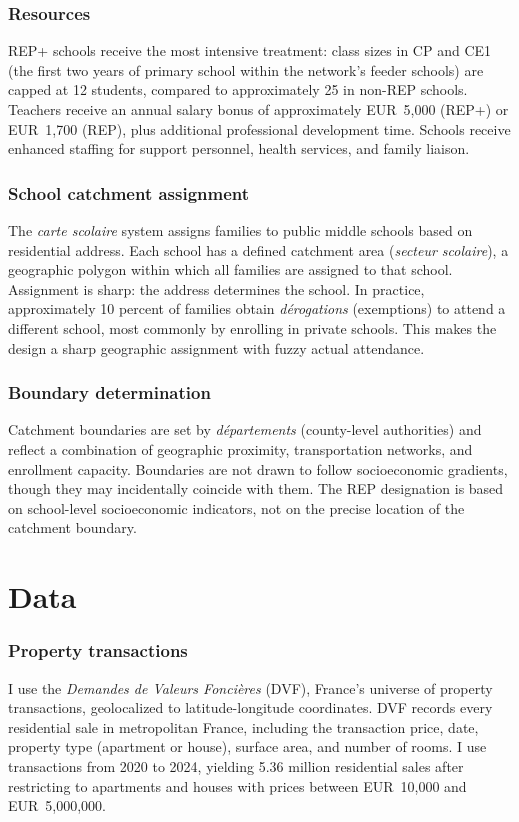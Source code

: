 \documentclass[12pt]{article}
\begin{document}
\subsubsection*{Resources} REP+ schools receive the most intensive treatment: class sizes in CP and CE1 (the first two years of primary school within the network's feeder schools) are capped at 12 students, compared to approximately 25 in non-REP schools. Teachers receive an annual salary bonus of approximately EUR~5,000 (REP+) or EUR~1,700 (REP), plus additional professional development time. Schools receive enhanced staffing for support personnel, health services, and family liaison.

\subsubsection*{School catchment assignment} The \textit{carte scolaire} system assigns families to public middle schools based on residential address. Each school has a defined catchment area (\textit{secteur scolaire}), a geographic polygon within which all families are assigned to that school. Assignment is sharp: the address determines the school. In practice, approximately 10 percent of families obtain \textit{d\'{e}rogations} (exemptions) to attend a different school, most commonly by enrolling in private schools. This makes the design a sharp geographic assignment with fuzzy actual attendance.

\subsubsection*{Boundary determination} Catchment boundaries are set by \textit{d\'{e}partements} (county-level authorities) and reflect a combination of geographic proximity, transportation networks, and enrollment capacity. Boundaries are not drawn to follow socioeconomic gradients, though they may incidentally coincide with them. The REP designation is based on school-level socioeconomic indicators, not on the precise location of the catchment boundary.


\section{Data}
\label{sec:data}

\subsubsection*{Property transactions} I use the \textit{Demandes de Valeurs Fonci\`{e}res} (DVF), France's universe of property transactions, geolocalized to latitude-longitude coordinates. DVF records every residential sale in metropolitan France, including the transaction price, date, property type (apartment or house), surface area, and number of rooms. I use transactions from 2020 to 2024, yielding 5.36 million residential sales after restricting to apartments and houses with prices between EUR~10,000 and EUR~5,000,000.
\end{document}
